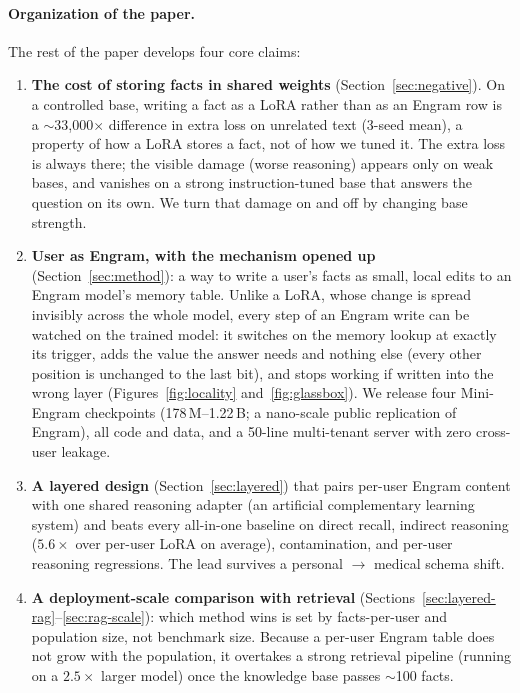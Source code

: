 \documentclass[letterpaper]{article} %
\begin{document}
\paragraph{Organization of the paper.}
The rest of the paper develops four core claims:
\begin{enumerate}[leftmargin=*,topsep=2pt,itemsep=2pt]
  \item \textbf{The cost of storing facts in shared weights}
        (Section~\ref{sec:negative}).
        On a controlled base, writing a fact as a LoRA rather than as
        an Engram row is a $\sim$33{,}000$\times$ difference in extra
        loss on unrelated text (3-seed mean), a property of how a
        LoRA stores a fact, not of how we tuned it. The extra loss is
        always there; the visible damage (worse reasoning) appears
        only on weak bases, and vanishes on a strong instruction-tuned
        base that answers the question on its own. We turn that damage
        on and off by changing base strength.
  \item \textbf{User as Engram, with the mechanism opened up}
        (Section~\ref{sec:method}):
        a way to write a user's facts as small, local edits to an
        Engram model's memory table. Unlike a LoRA, whose change is
        spread invisibly across the whole model, every step of an
        Engram write can be watched on the trained model: it switches
        on the memory lookup at exactly its trigger, adds the value
        the answer needs and nothing else (every other position is
        unchanged to the last bit), and stops working if written into
        the wrong layer (Figures~\ref{fig:locality} and~\ref{fig:glassbox}).
        We release four Mini-Engram checkpoints
        (178\,M--1.22\,B; a nano-scale public replication of
        Engram), all code and data, and a 50-line multi-tenant
        server with zero cross-user leakage.
  \item \textbf{A layered design} (Section~\ref{sec:layered})
        that pairs per-user Engram content with one shared
        reasoning adapter (an artificial complementary learning
        system) and beats every all-in-one baseline on direct
        recall, indirect reasoning ($5.6\times$ over per-user
        LoRA on average), contamination, and per-user reasoning regressions.
        The lead survives a personal $\to$ medical schema shift.
  \item \textbf{A deployment-scale comparison with retrieval}
        (Sections~\ref{sec:layered-rag}--\ref{sec:rag-scale}):
        which method wins is set by facts-per-user and population
        size, not benchmark size. Because a per-user Engram table
        does not grow with the population, it overtakes a strong
        retrieval pipeline (running on a $2.5\times$ larger
        model) once the knowledge base passes $\sim$100 facts.
\end{enumerate}
\end{document}
